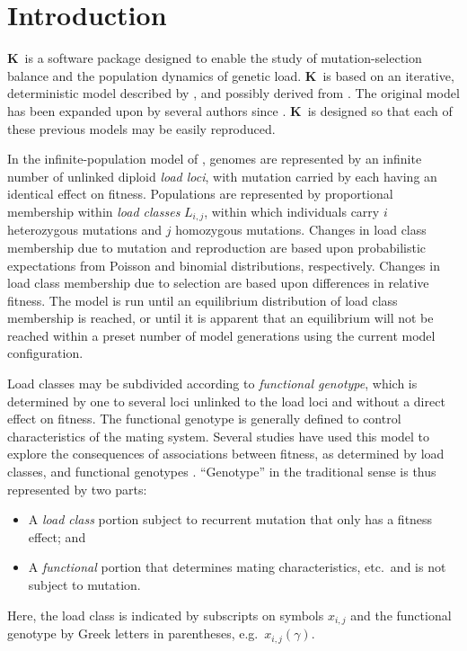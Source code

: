 \documentclass[12pt,twoside,letterpaper,fleqn]{report}
\numberwithin{equation}{section}  %
\newcommand{\K}{{\bf K}}
\newcommand{\xijg}{\mbox{$x_{i,j}(\gamma)$}}
\newcommand{\Lij}{\mbox{$L_{i,j}$}}              %
\begin{document}
\chapter{Introduction}

\K\ is a software package designed to enable the study of mutation-selection
balance and the population dynamics of genetic load.  \K\ is based on an
iterative, deterministic model described by \citet{Kondrashov:1985:5375}, and
possibly derived from \citet{Heller:1979:10277}.  The original model has been
expanded upon by several authors since \citep[e.g.,][and
others]{Charlesworth:1990:5337, Lande:1994:5345, Muirhead:1997:5426,
Morgan:2001:5443}.  \K\ is designed so that each of these previous models may
be easily reproduced.

In the infinite-population model of \citet{Kondrashov:1985:5375}, genomes are
represented by an infinite number of unlinked diploid {\em load loci}, with
mutation carried by each having an identical effect on fitness.  Populations
are represented by proportional membership within {\em load classes} \Lij,
within which individuals carry $i$ heterozygous mutations and $j$ homozygous
mutations.  Changes in load class membership due to mutation and reproduction
are based upon probabilistic expectations from Poisson and binomial
distributions, respectively.  Changes in load class membership due to selection
are based upon differences in relative fitness.  The model is run until an
equilibrium distribution of load class membership is reached, or until it is
apparent that an equilibrium will not be reached within a preset number of
model generations using the current model configuration.

Load classes may be subdivided according to {\em functional genotype}, which is
determined by one to several loci unlinked to the load loci and without a
direct effect on fitness.  The functional genotype is generally defined to
control characteristics of the mating system.  Several studies have used this
model to explore the consequences of associations between fitness, as
determined by load classes, and functional genotypes \citep[and
others]{Kondrashov:1985:5375, Charlesworth:1990:5337}.  ``Genotype'' in the
traditional sense is thus represented by two parts: \begin{itemize} \item A
{\em load class} portion subject to recurrent mutation that only has a fitness
effect; and \item A {\em functional} portion that determines mating
characteristics, etc.\ and is not subject to mutation.  \end{itemize} Here, the
load class is indicated by subscripts on symbols $x_{i,j}$ and the functional
genotype by Greek letters in parentheses, e.g.\ \xijg.
\end{document}
